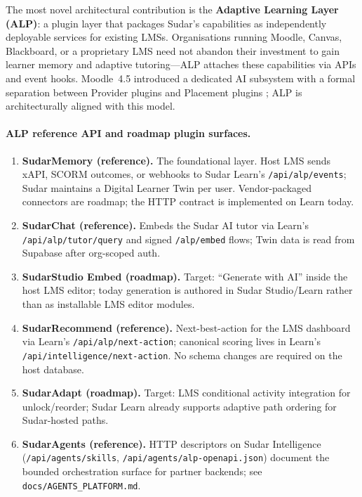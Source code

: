\documentclass[10pt,twocolumn]{article}
\begin{document}
The most novel architectural contribution is the \textbf{Adaptive
Learning Layer (ALP)}: a plugin layer that packages Sudar's
capabilities as independently deployable services for existing LMSs.
Organisations running Moodle, Canvas, Blackboard, or a proprietary LMS
need not abandon their investment to gain learner memory and adaptive
tutoring---ALP attaches these capabilities via APIs and event hooks.
Moodle~4.5 introduced a dedicated AI subsystem with a formal
separation between Provider plugins and Placement plugins
\cite{moodleai2025}; ALP is architecturally aligned with this model.

\paragraph{ALP reference API and roadmap plugin surfaces.}

\begin{enumerate}
  \item \textbf{SudarMemory (reference).} The foundational layer. Host
    LMS sends xAPI, SCORM outcomes, or webhooks to Sudar Learn's
    \texttt{/api/alp/events}; Sudar maintains a Digital Learner Twin per
    user. Vendor-packaged connectors are roadmap; the HTTP contract is
    implemented on Learn today.
  \item \textbf{SudarChat (reference).} Embeds the Sudar AI tutor via
    Learn's \texttt{/api/alp/tutor/query} and signed \texttt{/alp/embed}
    flows; Twin data is read from Supabase after org-scoped auth.
  \item \textbf{SudarStudio Embed (roadmap).} Target: ``Generate with
    AI'' inside the host LMS editor; today generation is authored in
    Sudar Studio/Learn rather than as installable LMS editor modules.
  \item \textbf{SudarRecommend (reference).} Next-best-action for the LMS
    dashboard via Learn's \texttt{/api/alp/next-action}; canonical scoring
    lives in Learn's \texttt{/api/intelligence/next-action}. No schema changes
    are required on the host database.
  \item \textbf{SudarAdapt (roadmap).} Target: LMS conditional activity
    integration for unlock/reorder; Sudar Learn already supports
    adaptive path ordering for Sudar-hosted paths.
  \item \textbf{SudarAgents (reference).} HTTP descriptors on Sudar Intelligence
    (\texttt{/api/agents/skills}, \texttt{/api/agents/alp-openapi.json})
    document the bounded orchestration surface for partner backends; see
    \texttt{docs/AGENTS\_PLATFORM.md}.
\end{enumerate}
\end{document}
